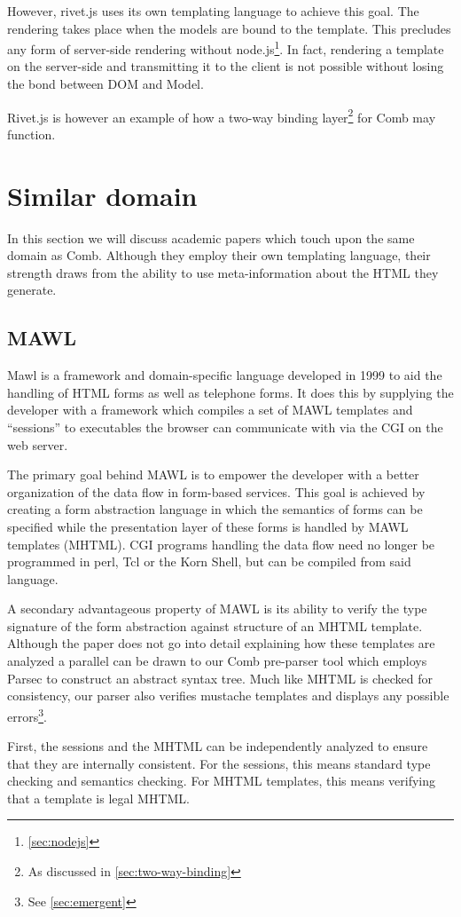 \documentclass[thesis.tex]{subfiles}
\begin{document}
However, rivet.js uses its own templating language to achieve this goal.
The rendering takes place when the models are bound to the template.
This precludes any form of server-side rendering without node.js\footnote{
\ref{sec:nodejs}}. In fact, rendering a template on the server-side and
transmitting it to the client is not possible without losing the bond between
DOM and Model.

Rivet.js is however an example of how a two-way binding layer\footnote{
As discussed in \ref{sec:two-way-binding}} for Comb may function.



\section{Similar domain}
In this section we will discuss academic papers which touch upon the same domain as Comb.
Although they employ their own templating language, their strength draws from
the ability to use meta-information about the HTML they generate.

\subsection{MAWL}
Mawl\cite{MAWL} is a framework and domain-specific language developed in 1999
to aid the handling of HTML forms as well as telephone forms.
It does this by supplying the developer with a framework which compiles
a set of MAWL templates and ``sessions'' to executables
the browser can communicate with via the CGI on the web server.

The primary goal behind MAWL is to empower the developer with a better
organization of the data flow in form-based services.
This goal is achieved by creating a form abstraction language in which the
semantics of forms can be specified while the presentation layer of these forms
is handled by MAWL templates (MHTML).
CGI programs handling the data flow need no longer be programmed in
perl, Tcl or the Korn Shell, but can be compiled from said language.

A secondary advantageous property of MAWL is its ability to verify the
type signature of the form abstraction against structure of an MHTML template.
Although the paper does not go into detail explaining how these templates are
analyzed a parallel can be drawn to our Comb pre-parser tool which employs
Parsec to construct an abstract syntax tree. Much like MHTML is checked for
consistency, our parser also verifies mustache templates and displays any
possible errors\footnote{See \ref{sec:emergent}}.
\begin{citequote}{\cite{MAWL}}
First, the sessions and the MHTML can be independently analyzed to ensure that
they are internally consistent.
For the sessions, this means standard type checking and semantics checking.
For MHTML templates, this means verifying that a template is legal MHTML.
\end{citequote}
\end{document}
